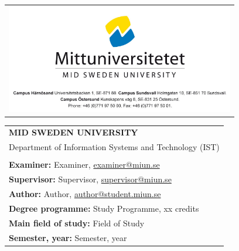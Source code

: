 \begin{titlepage}
\begin{tabular}{@{}c@{}}
		\includegraphics[width=10cm]{Pictures/miun_logo.png}
  \end{tabular}
    \newpage
		\addtolength{\voffset}{2.7cm}
		\addtolength{\hoffset}{2.7cm}
    \vspace*{15cm}
    \begin{tabular}{l}
     \textbf{MID SWEDEN UNIVERSITY}\\
     Department of Information Systems and Technology (IST)\\
     \\
     \normalsize{\textbf{Examiner:}} \normalsize{Examiner,
       \href{mailto:examiner@miun.se}{examiner@miun.se}}\\
     \normalsize{\textbf{Supervisor:}} \normalsize{Supervisor, 
       \href{mailto:supervisor@miun.se}{supervisor@miun.se}}\\
     \normalsize{\textbf{Author:}} \normalsize{Author, 
       \href{mailto:author@student.miun.se}{author@student.miun.se}}\\ 
     \normalsize{\textbf{Degree programme:}} \normalsize{Study Programme, xx credits}\\
     \normalsize{\textbf{Main field of study:}} \normalsize{Field of Study}\\
     \normalsize{\textbf{Semester, year:}} \normalsize{Semester, year}\\
    \end{tabular}
  \end{titlepage}

